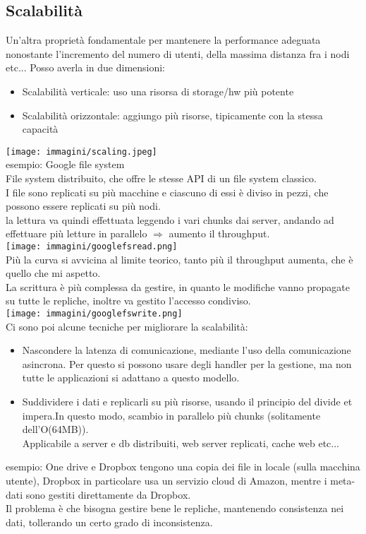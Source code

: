 \documentclass{article}
\begin{document}
\subsection{Scalabilità}
Un'altra proprietà fondamentale per mantenere la performance adeguata nonostante l'incremento del numero di utenti, della massima distanza fra i nodi etc... Posso averla in due dimensioni:
\begin{itemize}
\item Scalabilità verticale: uso una risorsa di storage/hw più potente
\item Scalabilità orizzontale: aggiungo più risorse, tipicamente con la stessa capacità 
\end{itemize}
\texttt{[image: immagini/scaling.jpeg]}\\
esempio: Google file system\\ File system distribuito, che offre le stesse API di un file system classico. \\ I file sono replicati su più macchine e ciascuno di essi è diviso in pezzi, che possono essere replicati su più nodi.\\ la lettura va quindi effettuata leggendo i vari chunks dai server, andando ad effettuare più letture in parallelo $\Rightarrow$ aumento il throughput.\\
\texttt{[image: immagini/googlefsread.png]}\\
Più la curva si avvicina al limite teorico, tanto più il throughput aumenta, che è quello che mi aspetto.\\ La scrittura è più complessa da gestire, in quanto le modifiche vanno propagate su tutte le repliche, inoltre va gestito l'accesso condiviso.\\
\texttt{[image: immagini/googlefswrite.png]}\\
Ci sono poi alcune tecniche per migliorare la scalabilità:
\begin{itemize}
\item Nascondere la latenza di comunicazione, mediante l'uso della comunicazione asincrona. Per questo si possono usare degli handler per la gestione, ma non tutte le applicazioni si adattano a questo modello.
\item Suddividere i dati e replicarli su più risorse, usando il principio del divide et impera.In questo modo, scambio in parallelo più chunks (solitamente dell'O(64MB)).\\ Applicabile a server e db distribuiti, web server replicati, cache web etc...
\end{itemize}
esempio: One drive e Dropbox tengono una copia dei file in locale (sulla macchina utente), Dropbox in particolare usa un servizio cloud di Amazon, mentre i meta-dati sono gestiti direttamente da Dropbox.\\
Il problema è che bisogna gestire bene le repliche, mantenendo consistenza nei dati, tollerando un certo grado di inconsistenza.
\end{document}
